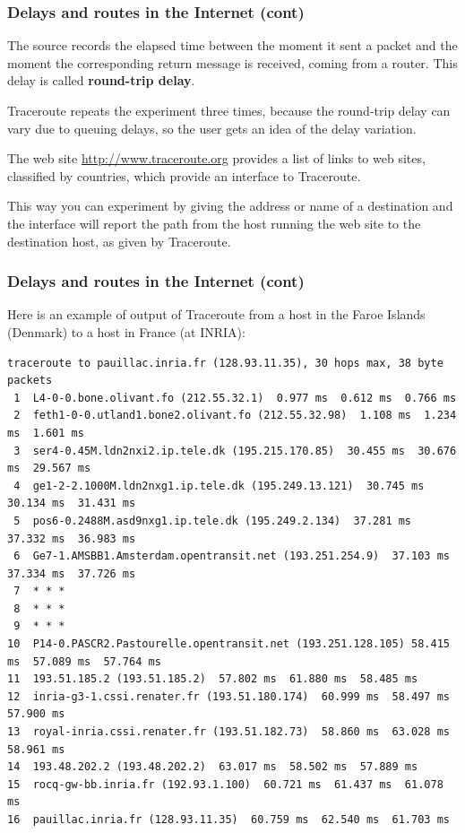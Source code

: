 %
\begin{frame}
\frametitle{Delays and routes in the Internet (cont)}

The source records the elapsed time between the moment it sent a
packet and the moment the corresponding return message is received,
coming from a router. This delay is called \textbf{round-trip delay}.

\bigskip

\textsf{Traceroute} repeats the experiment three times, because the
round-trip delay can vary due to queuing delays, so the user gets an
idea of the delay variation.

\bigskip

The web site \url{http://www.traceroute.org} provides a list of links
to web sites, classified by countries, which provide an interface to
\textsf{Traceroute}.

\bigskip

This way you can experiment by giving the address or name of a
destination and the interface will report the path from the host
running the web site to the destination host, as given by
\textsf{Traceroute}.

\end{frame}

%
\begin{frame}[containsverbatim]
\frametitle{Delays and routes in the Internet (cont)}

Here is an example of output of \textsf{Traceroute} from a host in the
Faroe Islands (Denmark) to a host in France (at INRIA):
{\tiny
\begin{verbatim}
traceroute to pauillac.inria.fr (128.93.11.35), 30 hops max, 38 byte packets
 1  L4-0-0.bone.olivant.fo (212.55.32.1)  0.977 ms  0.612 ms  0.766 ms
 2  feth1-0-0.utland1.bone2.olivant.fo (212.55.32.98)  1.108 ms  1.234 ms  1.601 ms
 3  ser4-0.45M.ldn2nxi2.ip.tele.dk (195.215.170.85)  30.455 ms  30.676 ms  29.567 ms
 4  ge1-2-2.1000M.ldn2nxg1.ip.tele.dk (195.249.13.121)  30.745 ms  30.134 ms  31.431 ms
 5  pos6-0.2488M.asd9nxg1.ip.tele.dk (195.249.2.134)  37.281 ms  37.332 ms  36.983 ms
 6  Ge7-1.AMSBB1.Amsterdam.opentransit.net (193.251.254.9)  37.103 ms  37.334 ms  37.726 ms
 7  * * *
 8  * * *
 9  * * *
10  P14-0.PASCR2.Pastourelle.opentransit.net (193.251.128.105) 58.415 ms  57.089 ms  57.764 ms
11  193.51.185.2 (193.51.185.2)  57.802 ms  61.880 ms  58.485 ms
12  inria-g3-1.cssi.renater.fr (193.51.180.174)  60.999 ms  58.497 ms  57.900 ms
13  royal-inria.cssi.renater.fr (193.51.182.73)  58.860 ms  63.028 ms  58.961 ms
14  193.48.202.2 (193.48.202.2)  63.017 ms  58.502 ms  57.889 ms
15  rocq-gw-bb.inria.fr (192.93.1.100)  60.721 ms  61.437 ms  61.078 ms
16  pauillac.inria.fr (128.93.11.35)  60.759 ms  62.540 ms  61.703 ms
\end{verbatim}
}

\end{frame}

